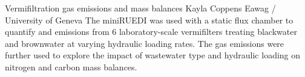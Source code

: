 \begin{conf-abstract}
{Vermifiltration gas emissions and mass balances}
{Kayla Coppens}
{Eawag / University of Geneva}
{The miniRUEDI was used with a static flux chamber to quantify  and  emissions from 6 laboratory-scale vermifilters treating blackwater and brownwater at varying hydraulic loading rates. The gas emissions were further used to explore the impact of wastewater type and hydraulic loading on nitrogen and carbon mass balances.}
\end{conf-abstract}
